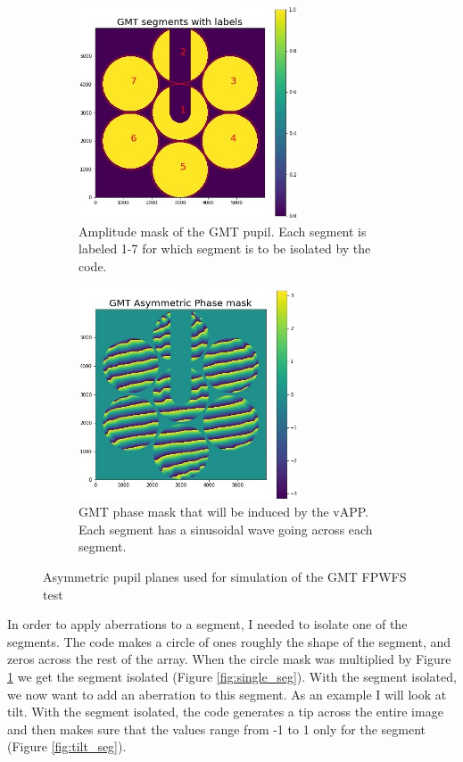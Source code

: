 \begin{figure}[H]
\centering
\begin{subfigure}{.5\textwidth}
  \centering
  \includegraphics[width=6.5cm]{Figures/GMT_seg_choice.jpg}
  \caption{Amplitude mask of the GMT pupil.  Each segment is labeled 1-7 for which segment is to be isolated by the code.}
  \label{fig:amp_mask}
\end{subfigure}%
\begin{subfigure}{.5\textwidth}
  \centering
  \includegraphics[width=6.5cm]{Figures/gmt_phase_mask.jpg}
  \caption{GMT phase mask that will be induced by the vAPP.  Each segment has a sinusoidal wave going across each segment.}
  \label{fig:phase_mask}
\end{subfigure}
\caption{Asymmetric pupil planes used for simulation of the GMT FPWFS test}
\label{fig:asym_pupils}
\end{figure}


In order to apply aberrations to a segment, I needed to isolate one of the segments.  The code makes a circle of ones roughly the shape of the segment, and zeros across the rest of the array. When the circle mask was multiplied by Figure \ref{fig:amp_mask} we get the segment isolated (Figure \ref{fig:single_seg}).  With the segment isolated, we now want to add an aberration to this segment.  As an example I will look at tilt.  With the segment isolated, the code generates a tip across the entire image and then makes sure that the values range from -1 to 1 only for the segment (Figure \ref{fig:tilt_seg}).  

